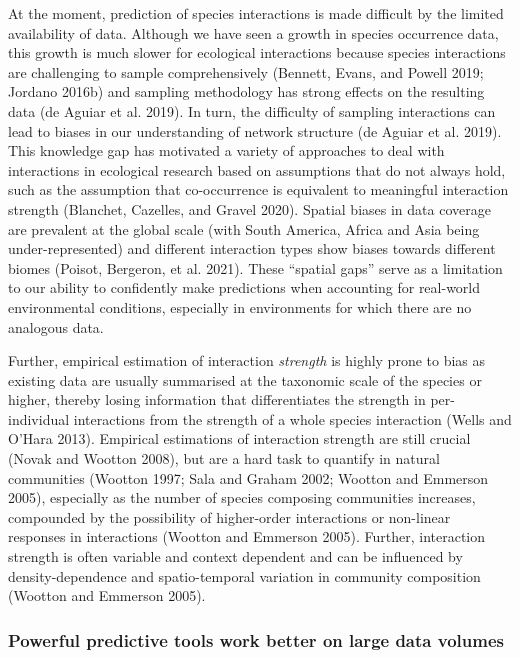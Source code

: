 \documentclass[11pt]{article}
\begin{document}
At the moment, prediction of species interactions is made difficult by
the limited availability of data. Although we have seen a growth in
species occurrence data, this growth is much slower for ecological
interactions because species interactions are challenging to sample
comprehensively (Bennett, Evans, and Powell 2019; Jordano 2016b) and
sampling methodology has strong effects on the resulting data (de Aguiar
et al. 2019). In turn, the difficulty of sampling interactions can lead
to biases in our understanding of network structure (de Aguiar et al.
2019). This knowledge gap has motivated a variety of approaches to deal
with interactions in ecological research based on assumptions that do
not always hold, such as the assumption that co-occurrence is equivalent
to meaningful interaction strength (Blanchet, Cazelles, and Gravel
2020). Spatial biases in data coverage are prevalent at the global scale
(with South America, Africa and Asia being under-represented) and
different interaction types show biases towards different biomes
(Poisot, Bergeron, et al. 2021). These ``spatial gaps'' serve as a
limitation to our ability to confidently make predictions when
accounting for real-world environmental conditions, especially in
environments for which there are no analogous data.

Further, empirical estimation of interaction \emph{strength} is highly
prone to bias as existing data are usually summarised at the taxonomic
scale of the species or higher, thereby losing information that
differentiates the strength in per-individual interactions from the
strength of a whole species interaction (Wells and O'Hara 2013).
Empirical estimations of interaction strength are still crucial (Novak
and Wootton 2008), but are a hard task to quantify in natural
communities (Wootton 1997; Sala and Graham 2002; Wootton and Emmerson
2005), especially as the number of species composing communities
increases, compounded by the possibility of higher-order interactions or
non-linear responses in interactions (Wootton and Emmerson 2005).
Further, interaction strength is often variable and context dependent
and can be influenced by density-dependence and spatio-temporal
variation in community composition (Wootton and Emmerson 2005).

\hypertarget{powerful-predictive-tools-work-better-on-large-data-volumes}{%
\subsubsection{Powerful predictive tools work better on large data
volumes}\label{powerful-predictive-tools-work-better-on-large-data-volumes}}
\end{document}
